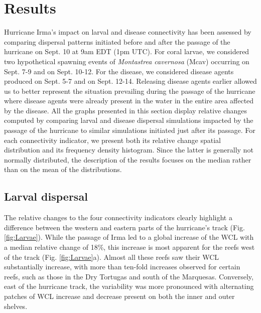 \documentclass[fleqn,10pt]{wlscirep}
\begin{document}
\section{Results}
Hurricane Irma's impact on larval and disease connectivity has been assessed by comparing dispersal patterns initiated before and after the passage of the hurricane on Sept. 10 at 9am EDT (1pm UTC). For coral larvae, we considered two hypothetical spawning events of {\it Montastrea cavernosa} (Mcav) occurring on Sept. 7-9 and on Sept. 10-12. For the disease, we considered disease agents produced on Sept. 5-7 and on Sept. 12-14. Releasing disease agents earlier allowed us to better represent the situation prevailing during the passage of the hurricane where disease agents were already present in the water in the entire area affected by the disease. All the graphs presented in this section display relative changes computed by comparing larval and disease dispersal simulations impacted by the passage of the hurricane to similar simulations initiated just after its passage. For each connectivity indicator, we present both its relative change spatial distribution and its frequency density histogram. Since the latter is generally not normally distributed, the description of the results focuses on the median rather than on the mean of the distributions.

\subsection{Larval dispersal}
The relative changes to the four connectivity indicators clearly highlight a difference between the western and eastern parts of the hurricane's track (Fig. \ref{fig:Larvae}). While the passage of Irma led to a global increase of the WCL with a median relative change of 18\%, this increase is most apparent for the reefs west of the track (Fig. \ref{fig:Larvae}a). Almost all these reefs saw their WCL substantially increase, with more than ten-fold increases observed for certain reefs, such as those in the Dry Tortugas and south of the Marquesas. Conversely, east of the hurricane track, the variability was more pronounced with alternating patches of WCL increase and decrease present on both the inner and outer shelves.
\end{document}
